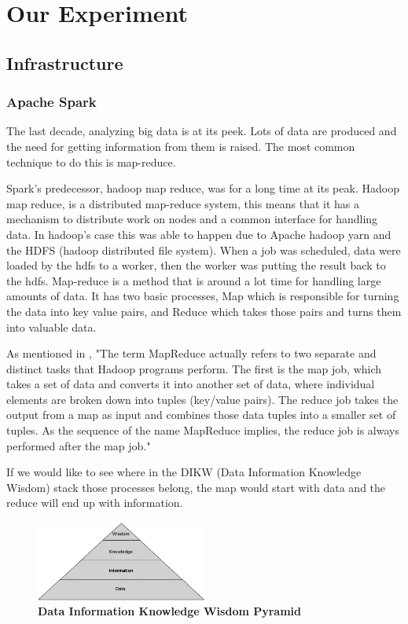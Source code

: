 \section{Our Experiment}
\subsection{Infrastructure}
\subsubsection{Apache Spark}
The last decade, analyzing big data is at its peek. Lots of data are produced and the need for getting information 
from them is raised. The most common technique to do this is map-reduce.

Spark's predecessor, hadoop map reduce, was for a long time at its peak.
 Hadoop map reduce, is a distributed map-reduce system, 
this means that it has a mechanism to distribute work on nodes 
and a common interface for handling data. In hadoop's case this was able
 to happen due to Apache hadoop yarn and the HDFS (hadoop distributed file system).
 When a job was scheduled, data were loaded by the hdfs to a worker, 
then the worker was putting the result back to the hdfs. 
Map-reduce is a method that is around a lot time for handling large amounts of data. 
It has two basic processes, Map which is responsible for turning the data into key value pairs, and Reduce which takes those pairs and turns them into valuable data.

As mentioned in \cite{ibmMapReduce:5}, "The term MapReduce actually refers to two separate and distinct tasks that Hadoop programs perform. The first is the map job, which takes a set of data and converts it into another set of data, where individual elements are broken down into tuples (key/value pairs). The reduce job takes the output from a map as input and combines those data tuples into a smaller set of tuples. As the sequence of the name MapReduce implies, the reduce job is always performed after the map job."

If we would like to see where in the DIKW (Data Information Knowledge Wisdom) stack those processes belong, the map would start with data and the reduce will end up with information.\\

\begin{figure}[h]
	\centering
	\includegraphics[width=0.5\textwidth]{images/DIKW.png}
	\caption{\bfseries Data Information Knowledge Wisdom Pyramid \cite{TheWisdomHierachy:7}}
	\label{dikw}
\end{figure}

